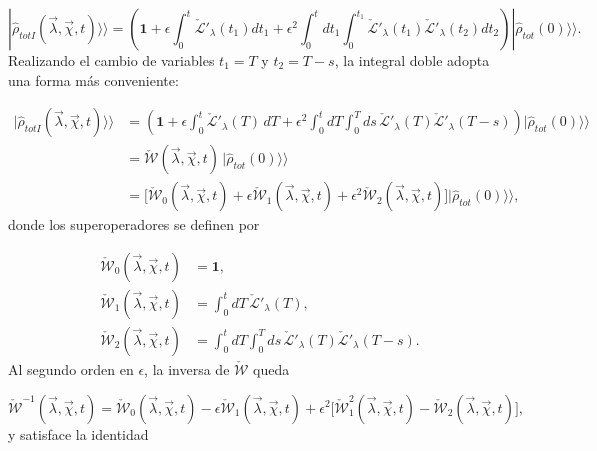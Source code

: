 \begin{appendixs}
\begin{equation*}
|\hat{\rho}_{totI}(\vec{\lambda},\vec{\chi},t)\rangle \rangle  = \left( \mathbf{1} + \epsilon \int_{0}^{t}\check{\mathcal{L}}'_{\lambda}(t_{1})dt_{1} + \epsilon^{2}\int_{0}^{t}dt_{1}\int_{0}^{t_{1}}\check{\mathcal{L}}'_{\lambda}(t_{1})\check{\mathcal{L}}'_{\lambda}(t_{2})dt_{2} \right) |\hat{\rho}_{tot}(0)\rangle \rangle .
\end{equation*}
Realizando el cambio de variables \(t_1=T\) y \(t_2=T-s\), la integral doble adopta una forma más conveniente:

\begin{align*}
|\hat{\rho}_{totI}(\vec{\lambda},\vec{\chi},t)\rangle \rangle  
&= \left( \mathbf{1} + \epsilon \int_{0}^{t}\check{\mathcal{L}}'_{\lambda}(T)\,dT + \epsilon^{2}\int_{0}^{t}dT\int_{0}^{T}ds\, \check{\mathcal{L}}'_{\lambda}(T)\check{\mathcal{L}}'_{\lambda}(T-s) \right)|\hat{\rho}_{tot}(0)\rangle \rangle  \\
&= \check{\mathcal{W}}(\vec{\lambda},\vec{\chi},t)\,|\hat{\rho}_{tot}(0)\rangle \rangle \\
&=  \big[\check{\mathcal{W}}_{0}(\vec{\lambda},\vec{\chi},t) + \epsilon \check{\mathcal{W}}_{1}(\vec{\lambda},\vec{\chi},t) + \epsilon^{2}\check{\mathcal{W}}_{2}(\vec{\lambda},\vec{\chi},t)\big] |\hat{\rho}_{tot}(0)\rangle \rangle ,
\end{align*}
donde los superoperadores se definen por

\begin{align*}
\check{\mathcal{W}}_{0}(\vec{\lambda},\vec{\chi},t) &= \mathbf{1},\\
\check{\mathcal{W}}_{1}(\vec{\lambda},\vec{\chi},t) &= \int_{0}^{t}dT \,\check{\mathcal{L}}'_{\lambda}(T),\\
\check{\mathcal{W}}_{2}(\vec{\lambda},\vec{\chi},t) &= \int_{0}^{t}dT \int_{0}^{T}ds \,\check{\mathcal{L}}'_{\lambda}(T)\check{\mathcal{L}}'_{\lambda}(T-s).
\end{align*}
Al segundo orden en \(\epsilon\), la inversa de \(\check{\mathcal{W}}\) queda

\begin{equation}
\check{\mathcal{W}}^{-1}(\vec{\lambda},\vec{\chi},t) =  \check{\mathcal{W}}_{0}(\vec{\lambda},\vec{\chi},t) - \epsilon  \check{\mathcal{W}}_{1}(\vec{\lambda},\vec{\chi},t) +  \epsilon^{2}\big[\check{\mathcal{W}}^{2}_{1}(\vec{\lambda},\vec{\chi},t) -  \check{\mathcal{W}}_{2}(\vec{\lambda},\vec{\chi},t) \big],
\label{apendix2inverseW}
\end{equation}
y satisface la identidad


\end{appendixs}
